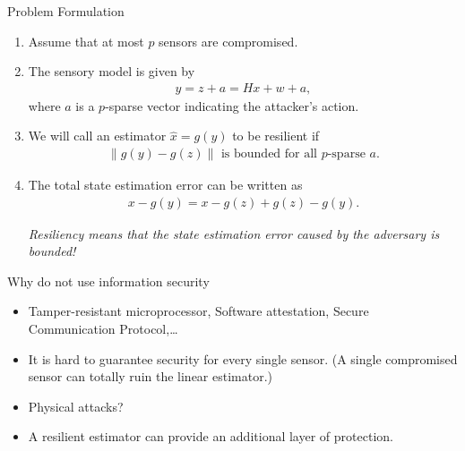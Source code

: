 \documentclass[10pt]{beamer}
\begin{document}
\begin{frame}{Problem Formulation}
  \begin{enumerate}
  \item Assume that at most $p$ sensors are compromised.
  \item The sensory model is given by
    \begin{align*}
      y = z + a = Hx + w +a,
    \end{align*}
    where $a$ is a $p$-sparse vector indicating the attacker's action.
  \item We will call an estimator $\hat x = g(y)$ to be resilient if
    \begin{align*}
      \|g(y) - g(z)\|\text{ is bounded for all $p$-sparse $a$}.
    \end{align*}
  \item The total state estimation error can be written as
    \begin{align*}
      x-g(y) = x-g(z) + g(z)-g(y).
    \end{align*}

    \emph{Resiliency means that the state estimation error caused by the adversary is bounded!}
  \end{enumerate}
\end{frame}

\begin{frame}{Why do not use information security}
  \begin{itemize}
  \item Tamper-resistant microprocessor, Software attestation, Secure Communication Protocol,\dots
  \item It is hard to guarantee security for every single sensor. (A single compromised sensor can totally ruin the linear estimator.)
  \item Physical attacks?
  \item A resilient estimator can provide an additional layer of protection.
  \end{itemize}
\end{frame}
\end{document}
